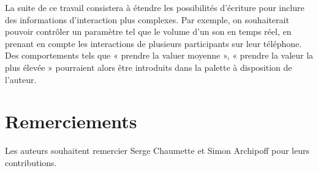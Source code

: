 \documentclass[10pt]{article}
\begin{document}
La suite de ce travail consistera à étendre les possibilités d'écriture pour inclure des informations d'interaction plus complexes.
Par exemple, on souhaiterait pouvoir contrôler un paramètre tel que le volume d'un son en temps réel, en prenant en compte les interactions de plusieurs participants sur leur téléphone. 
Des comportements tels que « prendre la valuer moyenne », « prendre la valeur la plus élevée » pourraient alors être introduits dans la palette à disposition de l'auteur.



\section{Remerciements}
Les auteurs souhaitent remercier Serge Chaumette et Simon Archipoff pour leurs contributions.

\printbibliography 
\end{document}
